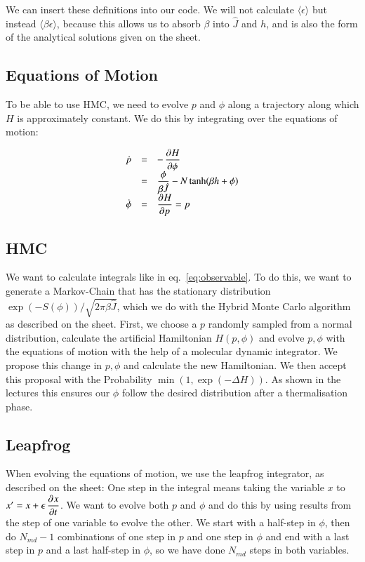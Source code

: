 \documentclass{scrartcl}
\begin{document}
We can insert these definitions into our code. We will not calculate $\langle \epsilon\rangle$ but instead $\langle \beta\epsilon\rangle$, because this allows us to absorb $\beta$ into $\hat{J}$ and $h$, and is also the form of the analytical solutions given on the sheet.



\subsection{Equations of Motion}

To be able to use HMC, we need to evolve $p$ and $\phi$ along a trajectory along which $H$ is approximately constant. We do this by integrating over the equations of motion:

\[\begin{array}{>{\displaystyle}r>{\displaystyle}c>{\displaystyle}l}
\dot{p}&=&-\dpd{H}{\phi}\\
&=&\frac{\phi}{\beta \hat{J}}-N\tanh(\beta h+\phi)\\
\dot{\phi}&=&\dpd{H}{p}=p
\end{array}\]

\subsection{HMC}

We want to calculate integrals like in eq.~\ref{eq:observable}. To do this, we want to generate  a Markov-Chain that has the stationary distribution $\exp(-S(\phi))/\sqrt{2\pi\beta\hat{J}}$, which we do with the Hybrid Monte Carlo algorithm as described on the sheet. First, we choose a $p$ randomly sampled from a normal distribution, calculate the artificial Hamiltonian $H(p, \phi)$ and evolve $p, \phi$ with the equations of motion with the help of a molecular dynamic integrator. We propose this change in $p,\phi$ and calculate the new Hamiltonian. We then accept this proposal with the Probability $\min(1, \exp(-\Delta H))$. As shown in the lectures this ensures our $\phi$ follow the desired distribution after a thermalisation phase.

\subsection{Leapfrog}

When evolving the equations of motion, we use the leapfrog integrator, as described on the sheet: One step in the integral means taking the variable $x$ to $x'=x+\epsilon\dpd{x}{t}$. We want to evolve both $p$ and $\phi$ and do this by using results from the step of one variable to evolve the other. We start with a half-step in $\phi$, then do $N_{md}-1$ combinations of one step in $p$ and one step in $\phi$ and end with a last step in $p$ and a last half-step in $\phi$, so we have done $N_{md}$ steps in both variables.
\end{document}
